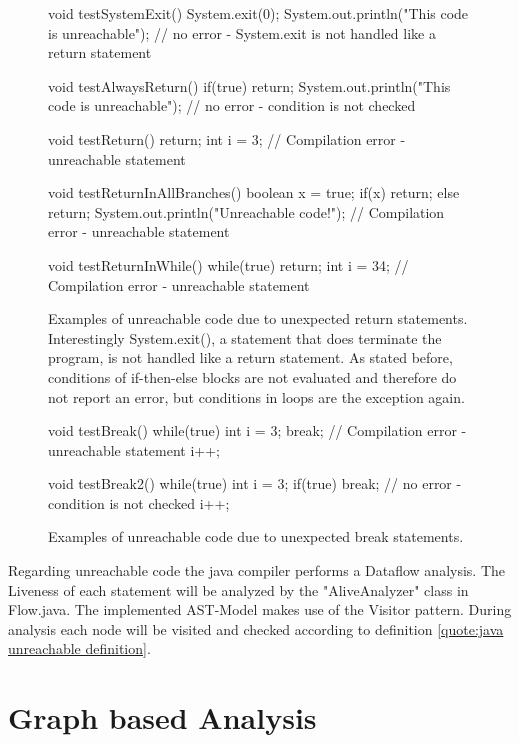 \begin{figure}[h!]
	\begin{JavaCode}
void testSystemExit() {
	System.exit(0);
	System.out.println("This code is unreachable"); // no error - System.exit is not handled like a return statement
}

void testAlwaysReturn() {
	if(true) return;
	System.out.println("This code is unreachable"); // no error - condition is not checked
}

void testReturn() {
	return;
	int i = 3; // Compilation error - unreachable statement
}

void testReturnInAllBranches() {
	boolean x = true;
	if(x) return;
	else return;
	System.out.println("Unreachable code!"); // Compilation error - unreachable statement
}

void testReturnInWhile() {
	while(true) {
		return;
	}
	int i = 34; // Compilation error - unreachable statement
}\end{JavaCode}
	\caption{Examples of unreachable code due to unexpected return statements. Interestingly System.exit(), a statement that does terminate the program, is not handled like a return statement. As stated before, conditions of if-then-else blocks are not evaluated and therefore do not report an error, but conditions in loops are the exception again. }
	\label{code:java unexpected return}
\end{figure}

\begin{figure}[h!]
	\begin{JavaCode}
void testBreak() {
	while(true) {
		int i = 3;
		break; // Compilation error - unreachable statement
		i++;
	}
}

void testBreak2() {
	while(true) {
		int i = 3;
		if(true) break; // no error - condition is not checked
		i++;
	}
}\end{JavaCode}
	\caption{Examples of unreachable code due to unexpected break statements.}
	\label{code:java unexpected break}
\end{figure}

Regarding unreachable code the java compiler performs a Dataflow analysis. The Liveness of each statement will be analyzed by the "AliveAnalyzer" class in Flow.java. The implemented AST-Model makes use of the Visitor pattern. During analysis each node will be visited and checked according to definition \ref{quote:java unreachable definition}.


\section{Graph based Analysis}


